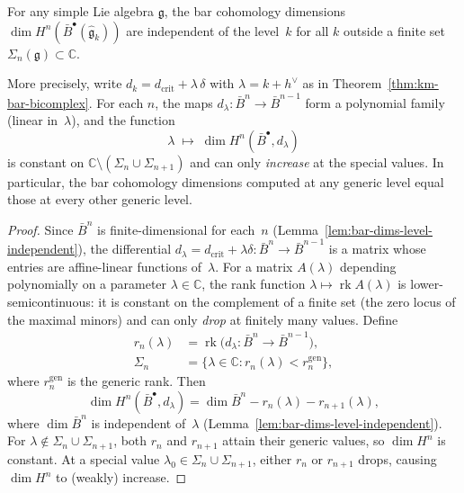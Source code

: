 \begin{theorem}
\label{thm:bar-cohomology-level-independence}
For any simple Lie algebra $\mathfrak{g}$, the bar cohomology
dimensions $\dim H^n(\bar{B}^\bullet(\widehat{\mathfrak{g}}_k))$
are independent of the level~$k$ for all $k$ outside a finite set
$\Sigma_n(\mathfrak{g}) \subset \mathbb{C}$.

More precisely, write $d_k = d_{\mathrm{crit}} + \lambda\,\delta$
with $\lambda = k + h^\vee$ as in
Theorem~\textup{\ref{thm:km-bar-bicomplex}}.
For each $n$, the maps
$d_\lambda\colon \bar{B}^n \to \bar{B}^{n-1}$ form a
polynomial family \textup{(}linear in~$\lambda$\textup{)},
and the function
\[
\lambda \;\mapsto\; \dim H^n(\bar{B}^\bullet, d_\lambda)
\]
is constant on $\mathbb{C} \setminus
(\Sigma_n \cup \Sigma_{n+1})$ and can only
\emph{increase} at the special values.
In particular, the bar cohomology dimensions computed at any
generic level equal those at every other generic level.
\end{theorem}

\begin{proof}
Since $\bar{B}^n$ is finite-dimensional for each~$n$
(Lemma~\ref{lem:bar-dims-level-independent}),
the differential $d_\lambda = d_{\mathrm{crit}} + \lambda\delta
\colon \bar{B}^n \to \bar{B}^{n-1}$
is a matrix whose entries are affine-linear functions of~$\lambda$.
For a matrix $A(\lambda)$ depending polynomially on a
parameter $\lambda \in \mathbb{C}$, the rank function
$\lambda \mapsto \operatorname{rk} A(\lambda)$ is
lower-semicontinuous: it is constant on the complement
of a finite set (the zero locus of the maximal minors)
and can only \emph{drop} at finitely many values.
Define
\begin{align*}
r_n(\lambda) &= \operatorname{rk}\bigl(d_\lambda
  \colon \bar{B}^n \to \bar{B}^{n-1}\bigr), \\
\Sigma_n &= \{\lambda \in \mathbb{C} :
  r_n(\lambda) < r_n^{\mathrm{gen}}\},
\end{align*}
where $r_n^{\mathrm{gen}}$ is the generic rank.  Then
\[
\dim H^n(\bar{B}^\bullet, d_\lambda)
= \dim \bar{B}^n - r_n(\lambda) - r_{n+1}(\lambda),
\]
where $\dim\bar{B}^n$ is independent of~$\lambda$
(Lemma~\ref{lem:bar-dims-level-independent}).  For
$\lambda \notin \Sigma_n \cup \Sigma_{n+1}$,
both $r_n$ and $r_{n+1}$ attain their generic values,
so $\dim H^n$ is constant.
At a special value $\lambda_0 \in \Sigma_n \cup \Sigma_{n+1}$,
either $r_n$ or $r_{n+1}$ drops, causing $\dim H^n$
to (weakly) increase.
\end{proof}


